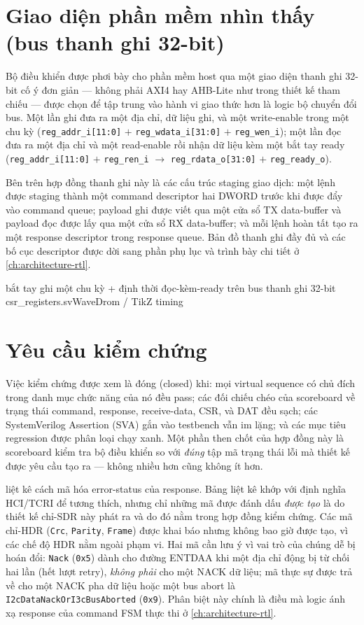 \section{Giao diện phần mềm nhìn thấy (bus thanh ghi 32-bit)}
\label{sec:req-swif}

Bộ điều khiển được phơi bày cho phần mềm host qua một giao diện thanh ghi 32-bit cố ý đơn giản
--- không phải AXI4 hay AHB-Lite như trong thiết kế tham chiếu --- được chọn để tập trung vào
hành vi giao thức hơn là logic bộ chuyển đổi bus. Một lần ghi đưa ra một địa chỉ, dữ liệu ghi, và
một write-enable trong một chu kỳ (\texttt{reg_addr_i[11:0]} ${+}$ \texttt{reg_wdata_i[31:0]}
${+}$ \texttt{reg_wen_i}); một lần đọc đưa ra một địa chỉ và một read-enable rồi nhận dữ liệu
kèm một bắt tay ready (\texttt{reg_addr_i[11:0]} ${+}$ \texttt{reg_ren_i} $\rightarrow$
\texttt{reg_rdata_o[31:0]} ${+}$ \texttt{reg_ready_o}).

Bên trên hợp đồng thanh ghi này là các cấu trúc staging giao dịch: một lệnh được staging thành
một command descriptor hai DWORD trước khi được đẩy vào command queue; payload ghi được viết qua
một cửa sổ TX data-buffer và payload đọc được lấy qua một cửa sổ RX data-buffer; và mỗi lệnh hoàn
tất tạo ra một response descriptor trong response queue. Bản đồ thanh ghi đầy đủ và các bố cục
descriptor được dời sang phần phụ lục và trình bày chi tiết ở \cref{ch:architecture-rtl}.

  {bắt tay ghi một chu kỳ + định thời đọc-kèm-ready trên bus thanh ghi 32-bit}
  {csr\_registers.sv}{WaveDrom / TikZ timing}

\section{Yêu cầu kiểm chứng}
\label{sec:req-verification}

Việc kiểm chứng được xem là đóng (closed) khi: mọi virtual sequence có chủ đích trong danh mục
chức năng của nó đều pass; các đối chiếu chéo của scoreboard về trạng thái command, response,
receive-data, CSR, và DAT đều sạch; các SystemVerilog Assertion (SVA) gắn vào testbench vẫn im
lặng; và các mục tiêu regression được phân loại chạy xanh. Một phần then chốt của hợp đồng này là
scoreboard kiểm tra bộ điều khiển so với \emph{đúng} tập mã trạng thái lỗi mà thiết kế được yêu
cầu tạo ra --- không nhiều hơn cũng không ít hơn.

 liệt kê cách mã hóa error-status của response. Bảng liệt kê khớp với định
nghĩa HCI/TCRI để tương thích, nhưng chỉ những mã được đánh dấu \emph{được tạo} là do thiết kế
chỉ-SDR này phát ra và do đó nằm trong hợp đồng kiểm chứng. Các mã chỉ-HDR (\texttt{Crc},
\texttt{Parity}, \texttt{Frame}) được khai báo nhưng không bao giờ được tạo, vì các chế độ HDR
nằm ngoài phạm vi. Hai mã cần lưu ý vì vai trò của chúng dễ bị hoán đổi: \texttt{Nack}
(\texttt{0x5}) dành cho đường ENTDAA khi một địa chỉ động bị từ chối hai lần (hết lượt retry),
\emph{không phải} cho một NACK dữ liệu; mã thực sự được trả về cho một NACK pha dữ liệu hoặc một
bus abort là \texttt{I2cDataNackOrI3cBusAborted} (\texttt{0x9}). Phân biệt này chính là điều mà
logic ánh xạ response của command FSM thực thi ở \cref{ch:architecture-rtl}.


